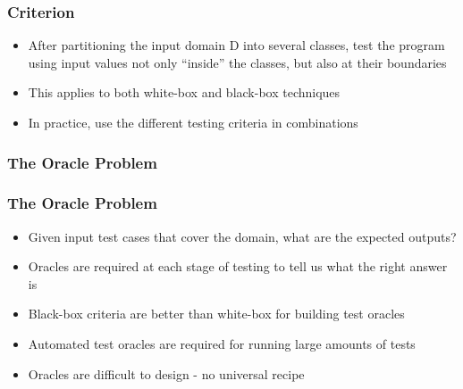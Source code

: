 \documentclass[t,12pt,numbers,fleqn]{beamer}
\begin{document}

\begin{frame}
\frametitle{Criterion}

\begin{itemize}

\item After partitioning the input domain D into several classes, test the
  program using input values not only ``inside'' the classes, but also at their
  boundaries
\item This applies to both white-box and black-box techniques
\item In practice, use the different testing criteria in combinations
\end{itemize}

\end{frame}


\begin{frame}
\frametitle{The Oracle Problem}


\end{frame}


\begin{frame}
\frametitle{The Oracle Problem}

\begin{itemize}

\item Given input test cases that cover the domain, what are the expected
  outputs?
\item Oracles are required at each stage of testing to tell us what the right
  answer is
\item Black-box criteria are better than white-box for building test oracles
\item Automated test oracles are required for running large amounts of tests
\item Oracles are difficult to design - no universal recipe
\end{itemize}

\end{frame}

\end{document}
